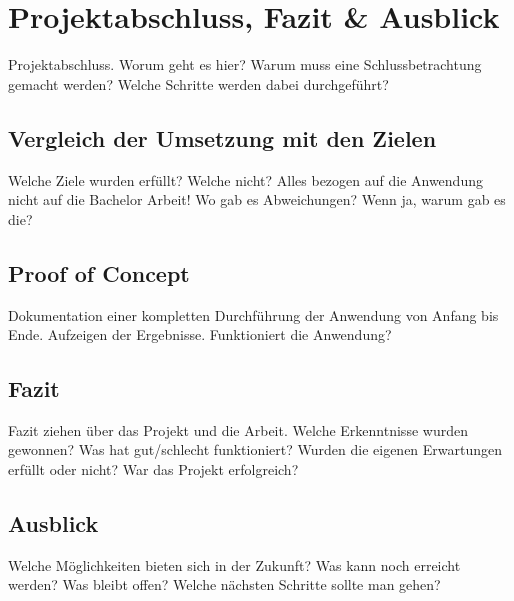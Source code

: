 
\chapter{Projektabschluss, Fazit \& Ausblick}\label{cha:Schlussbetrachtung}
Projektabschluss. Worum geht es hier? Warum muss eine Schlussbetrachtung gemacht werden? Welche Schritte werden dabei durchgeführt?

\section{Vergleich der Umsetzung mit den Zielen}
Welche Ziele wurden erfüllt? Welche nicht? Alles bezogen auf die Anwendung nicht auf die Bachelor Arbeit! Wo gab es Abweichungen? Wenn ja, warum gab es die?

\section{Proof of Concept}
Dokumentation einer kompletten Durchführung der Anwendung von Anfang bis Ende. Aufzeigen der Ergebnisse. Funktioniert die Anwendung?

\section{Fazit}\label{sec:Fazit}
Fazit ziehen über das Projekt und die Arbeit. Welche Erkenntnisse wurden gewonnen? Was hat gut/schlecht funktioniert? Wurden die eigenen Erwartungen erfüllt oder nicht? War das Projekt erfolgreich?

\section{Ausblick}\label{sec:Ausblick}
Welche Möglichkeiten bieten sich in der Zukunft? Was kann noch erreicht werden? Was bleibt offen? Welche nächsten Schritte sollte man gehen?